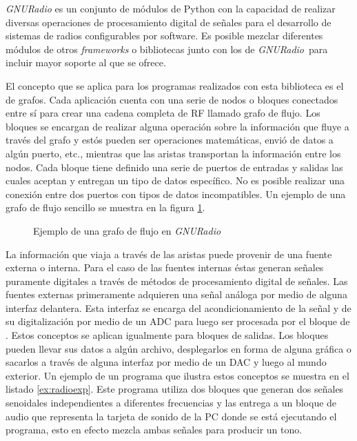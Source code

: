 \emph{GNURadio} es un conjunto de m\'odulos de Python con la capacidad de
realizar diversas operaciones de procesamiento digital de se\~nales para el desarrollo de
sistemas de radios configurables por software. Es posible mezclar diferentes
m\'odulos de otros \emph{frameworks} o bibliotecas junto con los de \emph{GNURadio}\
para incluir mayor soporte al que se ofrece.

El concepto que se aplica para los programas realizados con esta biblioteca es
el de grafos. Cada aplicaci\'on cuenta con una serie de nodos o bloques
conectados entre s\'i para crear una cadena completa de RF llamado grafo de
flujo. Los bloques se encargan de realizar alguna operaci\'on sobre la
informaci\'on que fluye a trav\'es del grafo y est\'os pueden ser operaciones
matem\'aticas, envi\'o de datos a alg\'un puerto, etc., mientras que las aristas
transportan la informaci\'on entre los nodos. Cada bloque tiene definido una
serie de puertos de entradas y salidas las cuales aceptan y entregan un tipo de
datos espec\'ifico. No es posible realizar una conexi\'on entre dos puertos con
tipos de datos incompatibles. Un ejemplo de una grafo de flujo sencillo se
muestra en la figura \ref{fig:radioflow}.

\begin{figure}[hpt]
  \centering
  \vspace{0.3in}
	\vspace{0.5in}
	\caption{Ejemplo de una grafo de flujo en \emph{GNURadio}}
	\label{fig:radioflow}
\end{figure}

La informaci\'on que viaja a trav\'es de las aristas puede provenir de una fuente
externa o interna. Para el caso de las fuentes internas \'estas generan se\~nales
puramente digitales a trav\'es de m\'etodos de procesamiento digital de
se\~nales. Las fuentes externas primeramente adquieren una se\~nal an\'aloga por
medio de alguna interfaz delantera. Esta interfaz se encarga del
acondicionamiento de la se\~nal y de su digitalizaci\'on por medio de un ADC
para luego ser procesada por el bloque de \gnuradio. Estos conceptos se
aplican igualmente para bloques de salidas. Los bloques pueden llevar sus
datos a alg\'un archivo, desplegarlos en forma de alguna gr\'afica o sacarlos a
trav\'es de alguna interfaz por medio de un DAC y luego al mundo exterior. Un
ejemplo de un programa que ilustra estos conceptos se muestra en el listado
\ref{ex:radioexp}. Este programa utiliza dos bloques que generan dos se\~nales
senoidales independientes a diferentes frecuencias y las entrega a un bloque de audio que
representa la tarjeta de sonido de la PC donde se est\'a ejecutando el programa,
esto en efecto mezcla ambas se\~nales para producir un tono.


